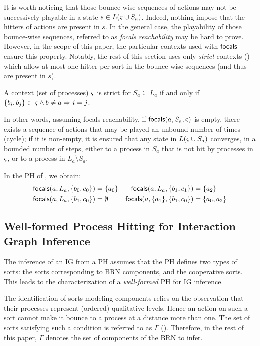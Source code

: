 It is worth noticing that those bounce-wise sequences of actions may not be successively playable in
a state $s\in L(\varsigma\cup S_a)$.
Indeed, nothing impose that the hitters of actions are present in $s$.
In the general case, the playability of those bounce-wise sequences, referred to as \emph{focals
reachability} may be hard to prove.
However, in the scope of this paper, the particular contexts used with $\mathsf{focals}$ ensure this property.
Notably, the rest of this section uses only \emph{strict} contexts () which
allow at most one hitter per sort in the bounce-wise sequences (and thus are present in $s$).

\begin{definition}\label{def:strict-ctx}
A context (set of processes) $\varsigma$ is strict for $S_a\subseteq L_a$ if and only if
$\{b_i,b_j\} \subset \varsigma \wedge b\neq a \Rightarrow i=j$.
\end{definition}

In other words, assuming focals reachability, if $\mathsf{focals}(a,S_a,\varsigma)$ is empty, there exists a
sequence of actions that may be played an unbound number of times (cycle);
if it is non-empty, it is ensured that any state in $L(\varsigma\cup S_a)$ converges, in a bounded
number of steps, either to a process in $S_a$ that is not hit by processes in $\varsigma$, or to a process in
$L_a\setminus S_a$.

\begin{example}
In the PH of , we obtain:
\begin{align*}
\mathsf{focals}(a,L_a,\{b_0,c_0\}) &= \{ a_0 \}
&
\mathsf{focals}(a,L_a,\{b_1,c_1\}) &= \{ a_2 \}
\\
\mathsf{focals}(a,L_a,\{b_1,c_0\}) &= \emptyset
&
\mathsf{focals}(a,\{a_1\},\{b_1,c_0\}) &= \{ a_0, a_2 \}
\end{align*}
\end{example}



\subsection{Well-formed Process Hitting for Interaction Graph Inference}\label{ssec:wf}

The inference of an IG from a PH assumes that the PH defines two types of sorts:
the sorts corresponding to BRN components, and the cooperative sorts.
This leads to the characterization of a \emph{well-formed} PH for IG inference.

The identification of sorts modeling components relies on the observation that their processes
represent (ordered) qualitative levels.
Hence an action on such a sort cannot make it bounce to a process at a distance more than one.
The set of sorts satisfying such a condition is referred to as $\Gamma$
().
Therefore, in the rest of this paper, $\Gamma$ denotes the set of components of the BRN to infer.

